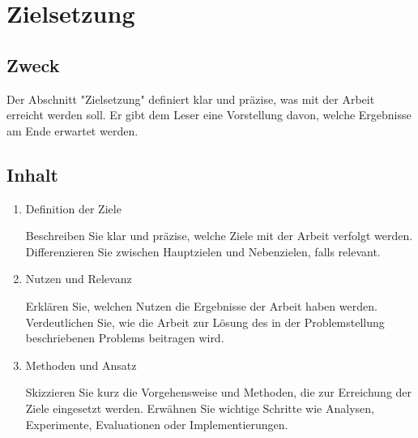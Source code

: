 \section{Zielsetzung}

\subsection*{Zweck}

Der Abschnitt "Zielsetzung" definiert klar und präzise, was mit der Arbeit
erreicht werden soll. Er gibt dem Leser eine Vorstellung davon, welche
Ergebnisse am Ende erwartet werden.

\subsection*{Inhalt}

\begin{enumerate}

\item Definition der Ziele

Beschreiben Sie klar und präzise, welche Ziele mit der Arbeit verfolgt werden.
Differenzieren Sie zwischen Hauptzielen und Nebenzielen, falls relevant.

\item Nutzen und Relevanz

Erklären Sie, welchen Nutzen die Ergebnisse der Arbeit haben werden.
Verdeutlichen Sie, wie die Arbeit zur Lösung des in der Problemstellung
beschriebenen Problems beitragen wird.

\item Methoden und Ansatz

Skizzieren Sie kurz die Vorgehensweise und Methoden, die zur Erreichung der
Ziele eingesetzt werden. Erwähnen Sie wichtige Schritte wie Analysen,
Experimente, Evaluationen oder Implementierungen.
\end{enumerate}